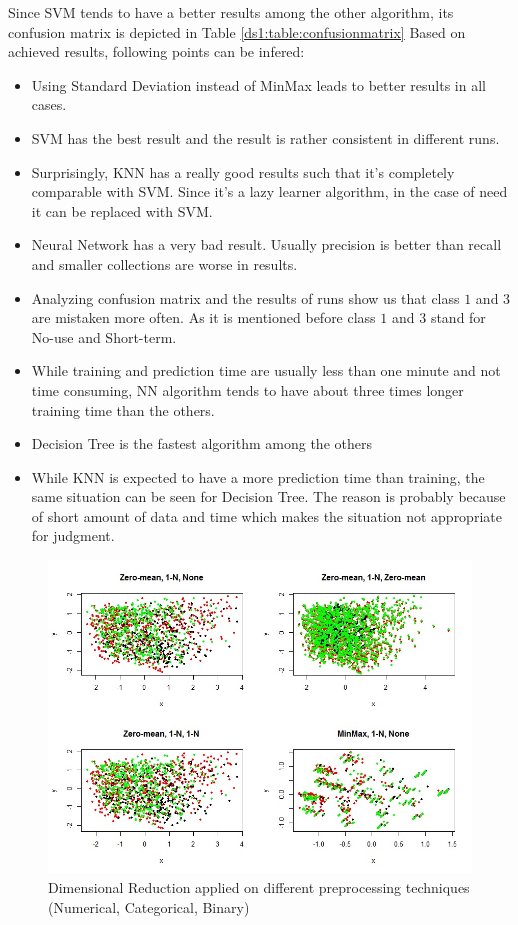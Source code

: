 Since SVM tends to have a better results among the other algorithm, its confusion matrix is depicted in Table \ref{ds1:table:confusionmatrix}
Based on achieved results, following points can be infered:
\begin{itemize}
\item Using Standard Deviation instead of MinMax leads to better results in all cases.
\item SVM has the best result and the result is rather consistent in different runs.
\item Surprisingly, KNN has a really good results such that it's completely comparable with SVM. Since it's a lazy learner algorithm, in the case of need it can be replaced with SVM.
\item Neural Network has a very bad result. Usually precision is better than recall and smaller collections are worse in results.
\item Analyzing confusion matrix and the results of runs show us that class $1$ and $3$ are mistaken more often. As it is mentioned before class $1$ and $3$ stand for No-use and Short-term.
\item While training and prediction time are usually less than one minute and not time consuming, NN algorithm tends to have about three times longer training time than the others.
\item Decision Tree is the fastest algorithm among the others
\item While KNN is expected to have a more prediction time than training, the same situation can be seen for Decision Tree. The reason is probably because of short amount of data and time which makes the situation not appropriate for judgment.
\end{itemize}

\begin{figure}[p]
\begin{center}
\includegraphics[scale=\figurescaling]{figures/db1/dim_reduction.jpg}
\caption{Dimensional Reduction applied on different preprocessing techniques (Numerical, Categorical, Binary)
\label{ds1:fig:dimred}}
\end{center}
\end{figure}



